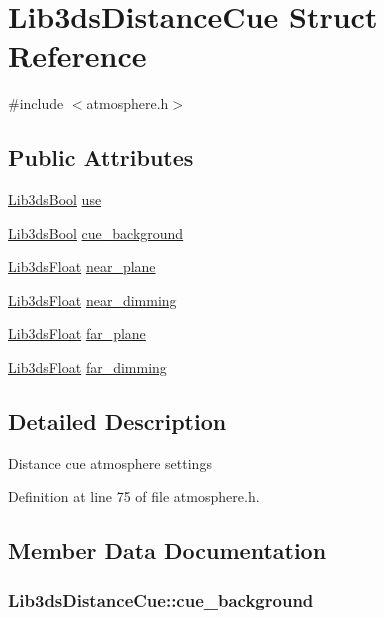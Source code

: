 \hypertarget{struct_lib3ds_distance_cue}{\section{Lib3ds\-Distance\-Cue Struct Reference}
\label{struct_lib3ds_distance_cue}
}


{\ttfamily \#include $<$atmosphere.\-h$>$}

\subsection*{Public Attributes}
\begin{DoxyCompactItemize}
\item 
\hyperlink{types_8h_a89dd7398a9ebbbf28011f8c32df67ad3}{Lib3ds\-Bool} \hyperlink{struct_lib3ds_distance_cue_a380770822ef6e9a2b8865dad59224cd7}{use}
\item 
\hyperlink{types_8h_a89dd7398a9ebbbf28011f8c32df67ad3}{Lib3ds\-Bool} \hyperlink{struct_lib3ds_distance_cue_a14005d1c87b9301253d301318d2321d5}{cue\-\_\-background}
\item 
\hyperlink{types_8h_ab18e70f51f9a53c9dee8d930c8e1a7bf}{Lib3ds\-Float} \hyperlink{struct_lib3ds_distance_cue_aca90abbcd3caa0a011a695cf0e299df6}{near\-\_\-plane}
\item 
\hyperlink{types_8h_ab18e70f51f9a53c9dee8d930c8e1a7bf}{Lib3ds\-Float} \hyperlink{struct_lib3ds_distance_cue_abcde04db96fba29be7eb4a8026adfad8}{near\-\_\-dimming}
\item 
\hyperlink{types_8h_ab18e70f51f9a53c9dee8d930c8e1a7bf}{Lib3ds\-Float} \hyperlink{struct_lib3ds_distance_cue_a6a7005a301ea7cbd4ff35ff6a3517f08}{far\-\_\-plane}
\item 
\hyperlink{types_8h_ab18e70f51f9a53c9dee8d930c8e1a7bf}{Lib3ds\-Float} \hyperlink{struct_lib3ds_distance_cue_a83309c153db13ede318c6722975749c9}{far\-\_\-dimming}
\end{DoxyCompactItemize}


\subsection{Detailed Description}
Distance cue atmosphere settings 

Definition at line 75 of file atmosphere.\-h.



\subsection{Member Data Documentation}
\hypertarget{struct_lib3ds_distance_cue_a14005d1c87b9301253d301318d2321d5}{
\subsubsection[{cue\-\_\-background}]{ Lib3ds\-Distance\-Cue\-::cue\-\_\-background}}\label{struct_lib3ds_distance_cue_a14005d1c87b9301253d301318d2321d5}


